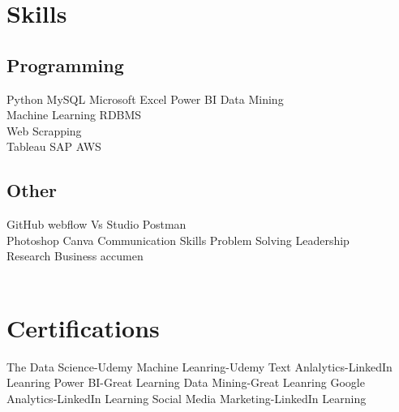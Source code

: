 \documentclass[]{Pratyush-resume-openfont}
\begin{document}
\begin{minipage}[t]{0.33\textwidth}



\section{Skills}
\subsection{Programming}
Python \textbullet{}   MySQL \textbullet{} Microsoft Excel \textbullet{} Power BI \textbullet{} Data Mining \textbullet{}  \\ Machine Learning \textbullet{} RDBMS\\ Web Scrapping \\ 
\sectionsep
{}
Tableau \textbullet{} SAP \textbullet{} AWS
\sectionsep

\subsection{Other}
GitHub \textbullet{}   webflow \textbullet{} Vs Studio \textbullet{} Postman \\
Photoshop \textbullet{} Canva \textbullet{} Communication Skills  \textbullet{} Problem Solving \textbullet{} Leadership \\ 
Research \textbullet{} Business accumen \\
\\
\section{Certifications}
The Data Science-Udemy \textbullet{} Machine Leanring-Udemy \textbullet{} Text Anlalytics-LinkedIn Leanring \textbullet{} Power BI-Great Learning \textbullet{} Data Mining-Great Leanring  \textbullet{} Google Analytics-LinkedIn Learning \textbullet{} Social Media Marketing-LinkedIn Learning \\ 
\sectionsep
%
%

\end{minipage} 
\hfill
\end{document}
